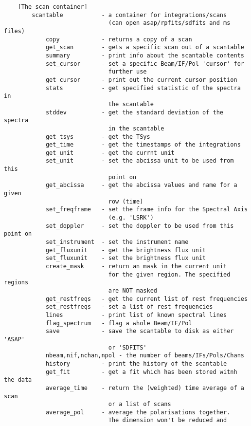 \documentclass[11pt]{article}
\begin{document}
\begin{verbatim}
    [The scan container]
        scantable           - a container for integrations/scans
                              (can open asap/rpfits/sdfits and ms files)
            copy            - returns a copy of a scan
            get_scan        - gets a specific scan out of a scantable
            summary         - print info about the scantable contents
            set_cursor      - set a specific Beam/IF/Pol 'cursor' for
                              further use
            get_cursor      - print out the current cursor position
            stats           - get specified statistic of the spectra in
                              the scantable
            stddev          - get the standard deviation of the spectra
                              in the scantable
            get_tsys        - get the TSys
            get_time        - get the timestamps of the integrations
            get_unit        - get the currnt unit
            set_unit        - set the abcissa unit to be used from this
                              point on
            get_abcissa     - get the abcissa values and name for a given
                              row (time)
            set_freqframe   - set the frame info for the Spectral Axis
                              (e.g. 'LSRK')
            set_doppler     - set the doppler to be used from this point on
            set_instrument  - set the instrument name
            get_fluxunit    - get the brightness flux unit
            set_fluxunit    - set the brightness flux unit
            create_mask     - return an mask in the current unit
                              for the given region. The specified regions
                              are NOT masked
            get_restfreqs   - get the current list of rest frequencies
            set_restfreqs   - set a list of rest frequencies
            lines           - print list of known spectral lines
            flag_spectrum   - flag a whole Beam/IF/Pol
            save            - save the scantable to disk as either 'ASAP'
                              or 'SDFITS'
            nbeam,nif,nchan,npol - the number of beams/IFs/Pols/Chans
            history         - print the history of the scantable
            get_fit         - get a fit which has been stored witnh the data
            average_time    - return the (weighted) time average of a scan
                              or a list of scans
            average_pol     - average the polarisations together.
                              The dimension won't be reduced and

\end{verbatim}
\end{document}

